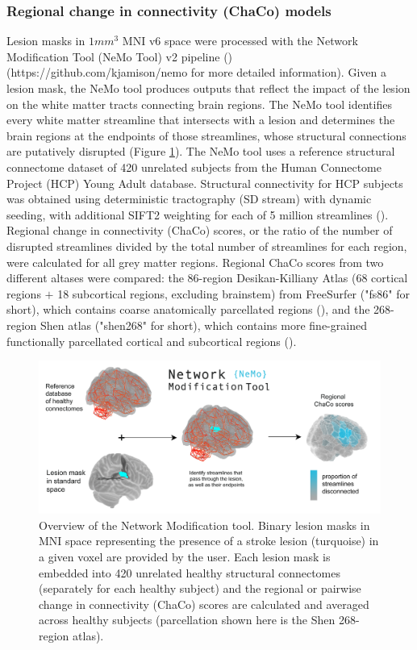\documentclass[10pt]{article}
\def\Plus{\texttt{+}}
\begin{document}
\subsubsection*{Regional change in connectivity (ChaCo) models}
Lesion masks in $1mm^3$ MNI v6 space were processed with the Network Modification Tool (NeMo Tool) v2 pipeline (\cite{Kuceyeski2013-nk}) (https://github.com/kjamison/nemo for more detailed information). Given a lesion mask, the NeMo tool produces outputs that reflect the impact of the lesion on the white matter tracts connecting brain regions. The NeMo tool identifies every white matter streamline that intersects with a lesion and determines the brain regions at the endpoints of those streamlines, whose structural connections are putatively disrupted (Figure \ref{nemo}). The NeMo tool uses a reference structural connectome dataset of 420 unrelated subjects from the Human Connectome Project (HCP) Young Adult database. Structural connectivity for HCP subjects was obtained using deterministic tractography (SD stream) with dynamic seeding, with additional SIFT2 weighting for each of 5 million streamlines (\cite{Smith2015-eb}). Regional change in connectivity (ChaCo) scores, or the ratio of the number of disrupted streamlines divided by the total number of streamlines for each region, were calculated for all grey matter regions. Regional ChaCo scores from two different altases were compared: the 86-region Desikan-Killiany Atlas (68 cortical regions $\Plus$ 18 subcortical regions, excluding brainstem) from FreeSurfer ("fs86" for short), which contains coarse anatomically parcellated regions (\cite{Desikan2006-vf,Fischl2002-lb}), and the 268-region Shen atlas ("shen268" for short), which contains more fine-grained functionally parcellated cortical and subcortical regions (\cite{Shen2013-zn}).

\begin{figure}[ht]
  \centering
  \includegraphics[width=1\linewidth]{figures/Multi-panelML_white_regional.png}
  \caption{Overview of the Network Modification tool. Binary lesion masks in MNI space representing the presence of a stroke lesion (turquoise) in a given voxel are provided by the user. Each lesion mask is embedded into 420 unrelated healthy structural connectomes (separately for each healthy subject) and the regional or pairwise change in connectivity (ChaCo) scores are calculated and averaged across healthy subjects (parcellation shown here is the Shen 268-region atlas). }
  \label{nemo}
\end{figure}
\end{document}
